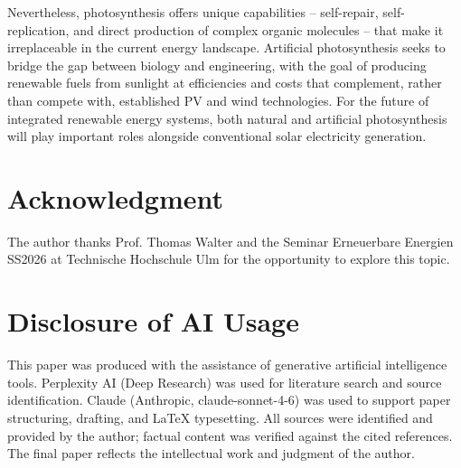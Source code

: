 \documentclass[conference]{IEEEtran}
\begin{document}
Nevertheless, photosynthesis offers unique capabilities -- self-repair, self-replication, and direct production of complex organic molecules -- that make it irreplaceable in the current energy landscape. Artificial photosynthesis seeks to bridge the gap between biology and engineering, with the goal of producing renewable fuels from sunlight at efficiencies and costs that complement, rather than compete with, established PV and wind technologies. For the future of integrated renewable energy systems, both natural and artificial photosynthesis will play important roles alongside conventional solar electricity generation.

\section*{Acknowledgment}
The author thanks Prof. Thomas Walter and the Seminar Erneuerbare Energien SS2026 at Technische Hochschule Ulm for the opportunity to explore this topic.

\section*{Disclosure of AI Usage}
This paper was produced with the assistance of generative artificial intelligence tools. Perplexity AI (Deep Research) was used for literature search and source identification. Claude (Anthropic, claude-sonnet-4-6) was used to support paper structuring, drafting, and \LaTeX{} typesetting. All sources were identified and provided by the author; factual content was verified against the cited references. The final paper reflects the intellectual work and judgment of the author.
\end{document}
